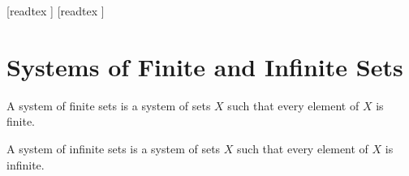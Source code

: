 \documentclass[10pt]{article}
\begin{document}
  \begin{imports}
    \begin{forthel}
      [readtex ]
      [readtex ]
    \end{forthel}
  \end{imports}


  \section*{Systems of Finite and Infinite Sets}

  \begin{forthel}
    \begin{definition}[id=FOUNDATIONS_14_1387314525765632,printid]
      A system of finite sets is a system of sets $X$ such that every element of $X$ is finite.
    \end{definition}
  \end{forthel}

  \begin{forthel}
    \begin{definition}[id=FOUNDATIONS_14_5698452102154785,printid]
      A system of infinite sets is a system of sets $X$ such that every element of $X$ is infinite.
    \end{definition}
  \end{forthel}
\end{document}
